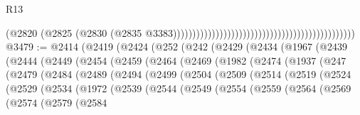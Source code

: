 \begin{lexlean}{R13}
\begin{coremodule}
                                                                                          (@2820
                                                                                            (@2825
                                                                                              (@2830
                                                                                                (@2835
                                                                                                  @3383)))))))))))))))))))))))))))))))))))))))))))))))
@3479 := @2414
    (@2419
      (@2424
        (@252
          (@242
            (@2429
              (@2434
                (@1967
                  (@2439
                    (@2444
                      (@2449
                        (@2454
                          (@2459
                            (@2464
                              (@2469
                                (@1982
                                  (@2474
                                    (@1937
                                      (@247
                                        (@2479
                                          (@2484
                                            (@2489
                                              (@2494
                                                (@2499
                                                  (@2504
                                                    (@2509
                                                      (@2514
                                                        (@2519
                                                          (@2524
                                                            (@2529
                                                              (@2534
                                                                (@1972
                                                                  (@2539
                                                                    (@2544
                                                                      (@2549
                                                                        (@2554
                                                                          (@2559
                                                                            (@2564
                                                                              (@2569
                                                                                (@2574
                                                                                  (@2579
                                                                                    (@2584

\end{coremodule}
\end{lexlean}

